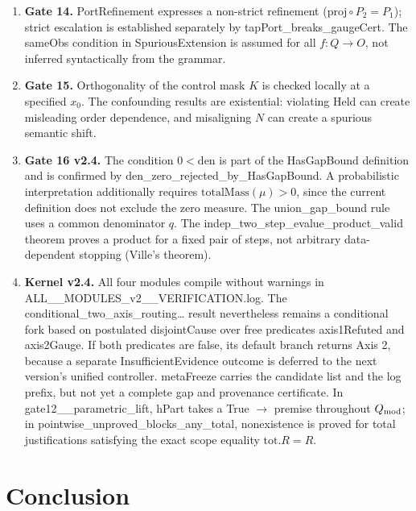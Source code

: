 \documentclass[11pt,a4paper]{article}
\begin{document}
\begin{enumerate}
\item \textbf{Gate 14.} PortRefinement expresses a non-strict refinement (\(\mathrm{proj}\circ P_2=P_1\)); strict escalation is established separately by tapPort\_\allowbreak breaks\_\allowbreak gaugeCert. The sameObs condition in SpuriousExtension is assumed for all \(f:Q\to O\), not inferred syntactically from the grammar.
\item \textbf{Gate 15.} Orthogonality of the control mask \(K\) is checked locally at a specified \(x_0\). The confounding results are existential: violating Held can create misleading order dependence, and misaligning \(N\) can create a spurious semantic shift.
\item \textbf{Gate 16 v2.4.} The condition \(0<\mathrm{den}\) is part of the HasGapBound definition and is confirmed by den\_\allowbreak zero\_\allowbreak rejected\_\allowbreak by\_\allowbreak HasGapBound. A probabilistic interpretation additionally requires \(\mathrm{totalMass}(\mu)>0\), since the current definition does not exclude the zero measure. The union\_\allowbreak gap\_\allowbreak bound rule uses a common denominator \(q\). The indep\_\allowbreak two\_\allowbreak step\_\allowbreak evalue\_\allowbreak product\_\allowbreak valid theorem proves a product for a fixed pair of steps, not arbitrary data-dependent stopping (Ville's theorem).
\item \textbf{Kernel v2.4.} All four modules compile without warnings in ALL\_\_\allowbreak MODULES\_\allowbreak v2\_\_\allowbreak VERIFICATION.log. The conditional\_\allowbreak two\_\allowbreak axis\_\allowbreak routing… result nevertheless remains a conditional fork based on postulated disjointCause over free predicates axis1Refuted and axis2Gauge. If both predicates are false, its default branch returns Axis 2, because a separate InsufficientEvidence outcome is deferred to the next version's unified controller. metaFreeze carries the candidate list and the log prefix, but not yet a complete gap and provenance certificate. In gate12\_\_\allowbreak parametric\_\allowbreak lift, hPart takes a True \(\to\) premise throughout \(Q_{\rm mod}\); in pointwise\_\allowbreak unproved\_\allowbreak blocks\_\allowbreak any\_\allowbreak total, nonexistence is proved for total justifications satisfying the exact scope equality \(\mathrm{tot}.R=R\).

\end{enumerate}
\section{Conclusion}
\end{document}
